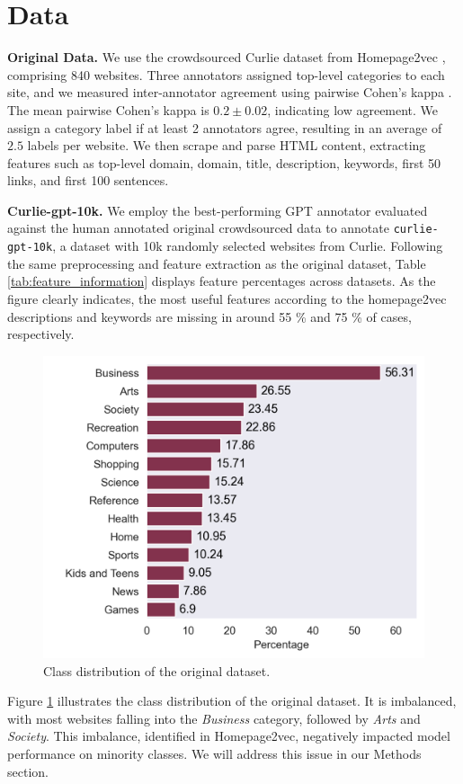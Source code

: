 \section{Data}\label{sec:data}

\textbf{Original Data.} We use the crowdsourced Curlie dataset from Homepage2vec \cite{homepage2vec}, comprising 840 websites. Three annotators assigned top-level categories to each site, and we measured inter-annotator agreement using pairwise Cohen's kappa \cite{cohen-coef}. The mean pairwise Cohen's kappa is $0.2 \pm 0.02$, indicating low agreement. We assign a category label if at least 2 annotators agree, resulting in an average of $2.5$ labels per website. We then scrape and parse HTML content, extracting features such as top-level domain, domain, title, description, keywords, first 50 links, and first 100 sentences.



\textbf{Curlie-gpt-10k.} 
We employ the best-performing GPT annotator evaluated against the human annotated original crowdsourced data to annotate \texttt{curlie-gpt-10k}, a dataset with 10k randomly selected websites from Curlie. 
Following the same preprocessing and feature extraction as the original dataset, Table \ref{tab:feature_information} displays feature percentages across datasets. 
As the figure clearly indicates, the most useful features according to the homepage2vec \cite{homepage2vec} descriptions and keywords are missing in around 55 \% and 75 \% of cases, respectively. 


\begin{figure}[!ht]
    \centering
    \includegraphics[width=1\columnwidth]{figures/category_distribution.png}
    \caption{Class distribution of the original dataset.}
    \label{fig:class_distribution}
\end{figure}

Figure \ref{fig:class_distribution} illustrates the class distribution of the original dataset. It is imbalanced, with most websites falling into the \textit{Business} category, followed by \textit{Arts} and \textit{Society}. This imbalance, identified in Homepage2vec, negatively impacted model performance on minority classes. We will address this issue in our Methods section.